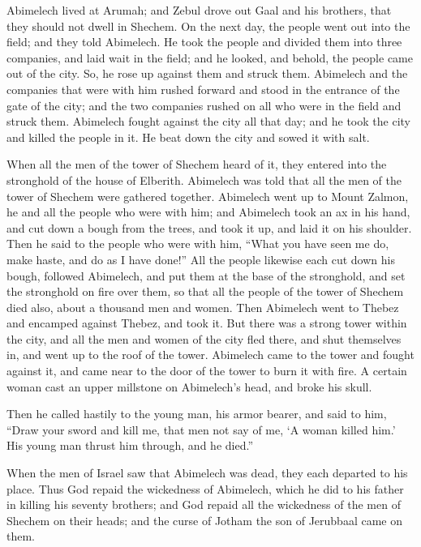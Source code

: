 {Abimelech lived at Arumah; and Zebul drove out Gaal and his brothers, that they should not dwell in Shechem.
On the next day, the people went out into the field; and they told Abimelech.
He took the people and divided them into three companies, and laid wait in the field; and he looked, and behold, the people came out of the city. So, he rose up against them and struck them.
Abimelech and the companies that were with him rushed forward and stood in the entrance of the gate of the city; and the two companies rushed on all who were in the field and struck them.
Abimelech fought against the city all that day; and he took the city and killed the people in it. He beat down the city and sowed it with salt.
\par }{\PP {}When all the men of the tower of Shechem heard of it, they entered into the stronghold of the house of Elberith.
Abimelech was told that all the men of the tower of Shechem were gathered together.
Abimelech went up to Mount Zalmon, he and all the people who were with him; and Abimelech took an ax in his hand, and cut down a bough from the trees, and took it up, and laid it on his shoulder. Then he said to the people who were with him, “What you have seen me do, make haste, and do as I have done!”
All the people likewise each cut down his bough, followed Abimelech, and put them at the base of the stronghold, and set the stronghold on fire over them, so that all the people of the tower of Shechem died also, about a thousand men and women.
Then Abimelech went to Thebez and encamped against Thebez, and took it.
But there was a strong tower within the city, and all the men and women of the city fled there, and shut themselves in, and went up to the roof of the tower.
Abimelech came to the tower and fought against it, and came near to the door of the tower to burn it with fire.
A certain woman cast an upper millstone on Abimelech’s head, and broke his skull.
\par }{\PP {}Then he called hastily to the young man, his armor bearer, and said to him, “Draw your sword and kill me, that men not say of me, ‘A woman killed him.’ His young man thrust him through, and he died.”
\par }{\PP {}When the men of Israel saw that Abimelech was dead, they each departed to his place.
Thus God repaid the wickedness of Abimelech, which he did to his father in killing his seventy brothers;
and God repaid all the wickedness of the men of Shechem on their heads; and the curse of Jotham the son of Jerubbaal came on them.

}
